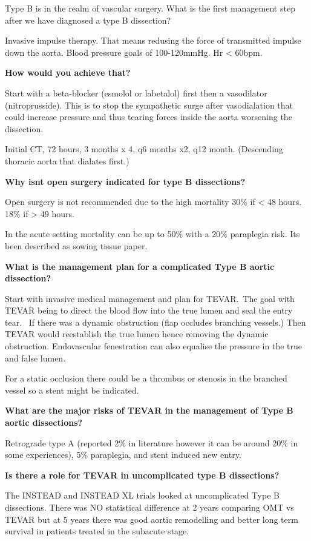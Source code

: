 \documentclass[
]{book}
\begin{document}
Type B is in the realm of vascular surgery. What is the first management
step after we have diagnosed a type B dissection?

Invasive impulse therapy. That means redusing the force of transmitted
impulse down the aorta. Blood pressure goals of 100-120mmHg. Hr \textless{}
60bpm.~

\textbf{How would you achieve that?}~

Start with a beta-blocker (esmolol or labetalol) first then a
vasodilator (nitroprusside). This is to stop the sympathetic surge after
vasodialation that could increase pressure and thus tearing forces
inside the aorta worsening the dissection.~

Initial CT, 72 hours, 3 months x 4, q6 months x2, q12 month. (Descending
thoracic aorta that dialates first.)~

\textbf{Why isnt open surgery indicated for type B dissections?}

Open surgery is not recommended due to the high mortality 30\% if \textless{} 48
hours. 18\% if \textgreater{} 49 hours.~

In the acute setting mortality can be up to 50\% with a 20\% paraplegia
risk. Its been described as sowing tissue paper.

\textbf{What is the management plan for a complicated Type B aortic
dissection?}

Start with invasive medical management and plan for TEVAR.~The goal with
TEVAR being to direct the blood flow into the true lumen and seal the
entry tear.~ If there was a dynamic obstruction (flap occludes branching
vessels.) Then TEVAR would reestablish the true lumen hence removing the
dynamic obstruction. Endovascular fenestration can also equalise the
pressure in the true and false lumen. \citep{lombardiSTABLEIIClinical2020}

For a static occlusion there could be a thrombus or stenosis in the
branched vessel so a stent might be indicated.~

\textbf{What are the major risks of TEVAR in the management of Type B aortic
dissections?}

Retrograde type A (reported 2\% in literature however it can be around
20\% in some experiences), 5\% paraplegia, and stent induced new entry.

\textbf{Is there a role for TEVAR in uncomplicated type B dissections?}

The INSTEAD and INSTEAD XL trials looked at uncomplicated Type B
dissections. There was NO statistical difference at 2 years comparing
OMT vs TEVAR but at 5 years there was good aortic remodelling and better
long term survival in patients treated in the subacute stage.~
\end{document}
